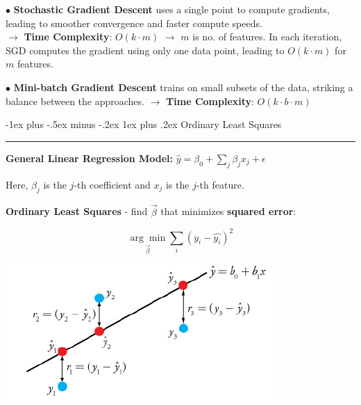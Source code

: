 \documentclass[letterpaper, 10.5pt,landscape]{article}
\makeatletter
\renewcommand{\subsubsection}{\@startsection{subsubsection}{3}{0mm}%
                                {-1ex plus -.5ex minus -.2ex}%
                                {1ex plus .2ex}%
                                {\normalfont\small\bfseries}}
\makeatother
\begin{document}
\begin{multicols*}{3}
\vspace{3pt}

$\bullet$ \textbf{Stochastic Gradient Descent} uses a single point to compute gradients, leading to smoother convergence and faster compute speeds. \\
$\rightarrow$ \textbf{Time Complexity}: \(O(k \cdot m) \) $\rightarrow$ $m$ is no. of features. In each iteration, SGD computes the gradient using only one data point, leading to \(O(k 
 \cdot m)\) for $m$ features. 



$\bullet$ \textbf{Mini-batch Gradient Descent} trains on small subsets of the data, striking a balance between the approaches.
$\rightarrow$ \textbf{Time Complexity}: \(O(k \cdot b \cdot m) \) 






\subsubsection{Ordinary Least Squares} {\color{teal}\hrule height 0.5pt} \smallskip

\textbf{General Linear Regression Model:} \(\boxed{\hat{y} = \beta_{0} + \sum_{j}\beta_{j}x_{j} + \epsilon} \)

Here, $\beta_{j}$ is the $j$-th coefficient and $x_{j}$ is the $j$-th feature.

\vspace{3pt}

\textbf{Ordinary Least Squares} - find $\Vec{\beta}$ that minimizes \textbf{squared error}:

\[ \boxed{ \underset{\vec{\beta}} {\arg\min} \sum_{i} \left(y_{i} - \hat{y_{i}}  \right)^2} \]

\begin{center}
    \begin{minipage}{0.75\linewidth}
    \includegraphics[width=\textwidth]{figures/ordinary_least_square.PNG}
\end{minipage}
\end{center}



\end{multicols*}
\end{document}
